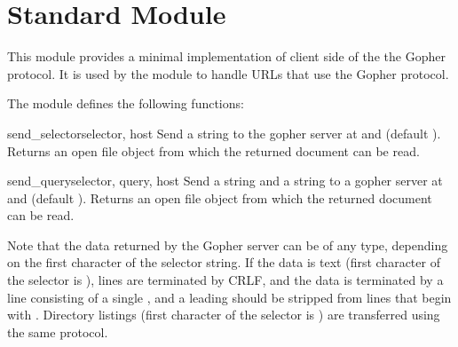 \section{Standard Module }
\label{module-gopherlib}


This module provides a minimal implementation of client side of the
the Gopher protocol.  It is used by the module  to handle
URLs that use the Gopher protocol.

The module defines the following functions:

\begin{funcdesc}{send_selector}{selector, host}
Send a  string to the gopher server at  and
 (default ).  Returns an open file object from
which the returned document can be read.
\end{funcdesc}

\begin{funcdesc}{send_query}{selector, query, host}
Send a  string and a  string to a gopher
server at  and  (default ).  Returns an
open file object from which the returned document can be read.
\end{funcdesc}

Note that the data returned by the Gopher server can be of any type,
depending on the first character of the selector string.  If the data
is text (first character of the selector is ), lines are
terminated by CRLF, and the data is terminated by a line consisting of
a single , and a leading  should be stripped from
lines that begin with .  Directory listings (first character
of the selector is ) are transferred using the same protocol.
